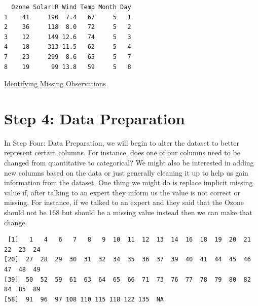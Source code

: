 \documentclass[
  letterpaper,
  DIV=11,
  numbers=noendperiod]{scrreprt}
\newenvironment{Shaded}{\begin{snugshade}}{\end{snugshade}}
\newcommand{\AttributeTok}[1]{\textcolor[rgb]{0.40,0.45,0.13}{#1}}
\newcommand{\ConstantTok}[1]{\textcolor[rgb]{0.56,0.35,0.01}{#1}}
\newcommand{\DecValTok}[1]{\textcolor[rgb]{0.68,0.00,0.00}{#1}}
\newcommand{\FunctionTok}[1]{\textcolor[rgb]{0.28,0.35,0.67}{#1}}
\newcommand{\NormalTok}[1]{\textcolor[rgb]{0.00,0.23,0.31}{#1}}
\newcommand{\OtherTok}[1]{\textcolor[rgb]{0.00,0.23,0.31}{#1}}
\newcommand{\SpecialCharTok}[1]{\textcolor[rgb]{0.37,0.37,0.37}{#1}}
\begin{document}
\begin{verbatim}
  Ozone Solar.R Wind Temp Month Day
1    41     190  7.4   67     5   1
2    36     118  8.0   72     5   2
3    12     149 12.6   74     5   3
4    18     313 11.5   62     5   4
7    23     299  8.6   65     5   7
8    19      99 13.8   59     5   8
\end{verbatim}

\begin{watch}{}{}
    \href{https://youtu.be/Qqs3RrHd4xQ}{Identifying Missing Observations}
\end{watch}

\section{Step 4: Data Preparation}\label{step-4-data-preparation}

In Step Four: Data Preparation, we will begin to alter the dataset to
better represent certain columns. For instance, does one of our columns
need to be changed from quantitative to categorical? We might also be
interested in adding new columns based on the data or just generally
cleaning it up to help us gain information from the dataset. One thing
we might do is replace implicit missing value if, after talking to an
expert they inform us the value is not correct or missing. For instance,
if we talked to an expert and they said that the Ozone should not be 168
but should be a missing value instead then we can make that change.

\begin{Shaded}
\end{Shaded}

\begin{verbatim}
 [1]   1   4   6   7   8   9  10  11  12  13  14  16  18  19  20  21  22  23  24
[20]  27  28  29  30  31  32  34  35  36  37  39  40  41  44  45  46  47  48  49
[39]  50  52  59  61  63  64  65  66  71  73  76  77  78  79  80  82  84  85  89
[58]  91  96  97 108 110 115 118 122 135  NA
\end{verbatim}
\end{document}
